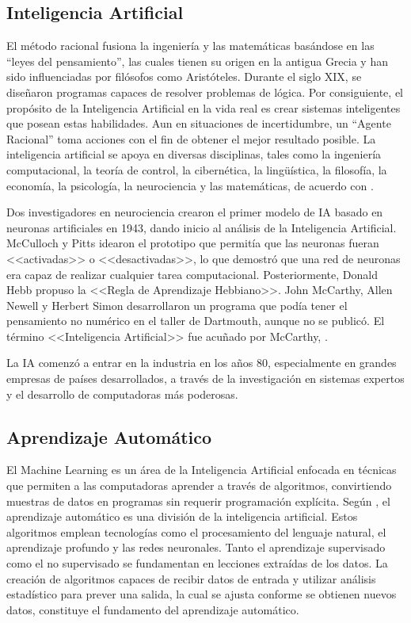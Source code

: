 \subsection{Inteligencia Artificial}

El método racional fusiona la ingeniería y las matemáticas basándose en las “leyes del pensamiento”, las cuales tienen su origen en la antigua Grecia y han sido influenciadas por filósofos como Aristóteles. Durante el siglo XIX, se diseñaron programas capaces de resolver problemas de lógica. Por consiguiente, el propósito de la Inteligencia Artificial en la vida real es crear sistemas inteligentes que posean estas habilidades. Aun en situaciones de incertidumbre, un “Agente Racional” toma acciones con el fin de obtener el mejor resultado posible. La inteligencia artificial se apoya en diversas disciplinas, tales como la ingeniería computacional, la teoría de control, la cibernética, la lingüística, la filosofía, la economía, la psicología, la neurociencia y las matemáticas, de acuerdo con \cite{bk_russell2004intart}.

Dos investigadores en neurociencia crearon el primer modelo de IA basado en neuronas artificiales en 1943, dando inicio al análisis de la Inteligencia Artificial. McCulloch y Pitts idearon el prototipo que permitía que las neuronas fueran <<activadas>> o <<desactivadas>>, lo que demostró que una red de neuronas era capaz de realizar cualquier tarea computacional. Posteriormente, Donald Hebb propuso la <<Regla de Aprendizaje Hebbiano>>. John McCarthy, Allen Newell y Herbert Simon desarrollaron un programa que podía tener el pensamiento no numérico en el taller de Dartmouth, aunque no se publicó. El término <<Inteligencia Artificial>> fue acuñado por McCarthy, \parencite{bk_russell2004intart}.

La IA comenzó a entrar en la industria en los años 80, especialmente en grandes empresas de países desarrollados, a través de la investigación en sistemas expertos y el desarrollo de computadoras más poderosas.

\subsection{Aprendizaje Automático}
El Machine Learning es un área de la Inteligencia Artificial enfocada en técnicas que permiten a las computadoras aprender a través de algoritmos, convirtiendo muestras de datos en programas sin requerir programación explícita. Según \cite{bk_russell2009intart}, el aprendizaje automático es una división de la inteligencia artificial. Estos algoritmos emplean tecnologías como el procesamiento del lenguaje natural, el aprendizaje profundo y las redes neuronales. Tanto el aprendizaje supervisado como el no supervisado se fundamentan en lecciones extraídas de los datos. La creación de algoritmos capaces de recibir datos de entrada y utilizar análisis estadístico para prever una salida, la cual se ajusta conforme se obtienen nuevos datos, constituye el fundamento del aprendizaje automático. \parencite{bk_alpaydin2014ml}

